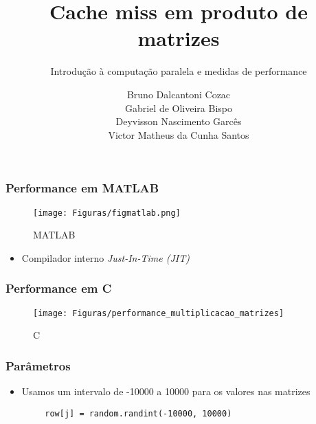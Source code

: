\documentclass[utf8]{beamer}
\theoremstyle{definition}
\begin{document}
	\author{ Bruno Dalcantoni Cozac \\
		  	 Gabriel de Oliveira Bispo\\
			 Deyvisson Nascimento Garcês \\
			 Victor Matheus da Cunha Santos \\ }
	\title{Cache miss em produto de matrizes}
	\subtitle{Introdução à computação paralela e medidas de performance}
	\subject{}

	\begin{frame}[plain]
		\maketitle
	\end{frame}




\begin{frame}
		\frametitle{Performance em MATLAB}
	\begin{figure}[H]
		\centering
		\texttt{[image: Figuras/figmatlab.png]}
		\caption{MATLAB}
		\label{fig:matmultr2022}
	\end{figure}
	
\end{frame}
\begin{frame}
	\begin{itemize}
		\item Compilador interno \textit{Just-In-Time (JIT)}
	\end{itemize}
\end{frame}


\begin{frame}
	\frametitle{Performance em C}
	\begin{figure}[H]
		\centering
		\texttt{[image: Figuras/performance\_multiplicacao\_matrizes]}
		\caption{C}
		\label{fig:performace_c}
	\end{figure}
	
\end{frame}

\begin{frame}[fragile]
	\frametitle{Parâmetros}
	\begin{itemize}
		\item Usamos um intervalo de -10000 a 10000 para os valores nas matrizes
	\end{itemize}
	\begin{lstlisting}
		row[j] = random.randint(-10000, 10000)
	\end{lstlisting}

\end{frame}
\end{document}
